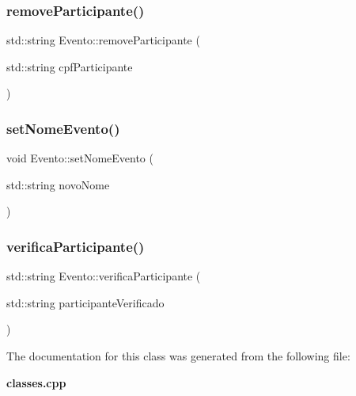 \mbox{\label{class_evento_a70cfddabe50e5c30192793df05ae2e98}} 
\subsubsection{remove\+Participante()}
{\footnotesize\ttfamily std\+::string Evento\+::remove\+Participante (\begin{DoxyParamCaption}\item[{std\+::string}]{cpf\+Participante }\end{DoxyParamCaption})\hspace{0.3cm}{\ttfamily [inline]}}

\mbox{\label{class_evento_a5937b444c2eaab9142ca4c471b0bf6e2}} 
\subsubsection{set\+Nome\+Evento()}
{\footnotesize\ttfamily void Evento\+::set\+Nome\+Evento (\begin{DoxyParamCaption}\item[{std\+::string}]{novo\+Nome }\end{DoxyParamCaption})\hspace{0.3cm}{\ttfamily [inline]}}

\mbox{\label{class_evento_a1ece82df7056f7815effbc5864c23278}} 
\subsubsection{verifica\+Participante()}
{\footnotesize\ttfamily std\+::string Evento\+::verifica\+Participante (\begin{DoxyParamCaption}\item[{std\+::string}]{participante\+Verificado }\end{DoxyParamCaption})\hspace{0.3cm}{\ttfamily [inline]}}



The documentation for this class was generated from the following file\+:\begin{DoxyCompactItemize}
\item 
\textbf{ classes.\+cpp}\end{DoxyCompactItemize}
